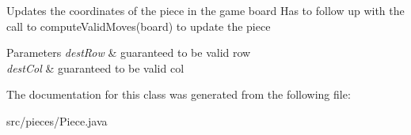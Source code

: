 Updates the coordinates of the piece in the game board Has to follow up with the call to compute\+Valid\+Moves(board) to update the piece 
\begin{DoxyParams}{Parameters}
{\em dest\+Row} & guaranteed to be valid row \\
\hline
{\em dest\+Col} & guaranteed to be valid col \\
\hline
\end{DoxyParams}


The documentation for this class was generated from the following file\+:\begin{DoxyCompactItemize}
\item 
src/pieces/Piece.\+java\end{DoxyCompactItemize}
